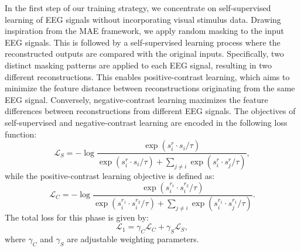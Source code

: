 \documentclass[conference]{IEEEtran}
\begin{document}
In the first step of our training strategy, we concentrate on self-supervised learning of EEG signals without incorporating visual stimulus data. Drawing inspiration from the MAE framework, we apply random masking to the input EEG signals. This is followed by a self-supervised learning process where the reconstructed outputs are compared with the original inputs. Specifically, two distinct masking patterns are applied to each EEG signal, resulting in two different reconstructions. This enables positive-contrast learning, which aims to minimize the feature distance between reconstructions originating from the same EEG signal. Conversely, negative-contrast learning maximizes the feature differences between reconstructions from different EEG signals. The objectives of self-supervised and negative-contrast learning are encoded in the following loss function: 
\vspace{-4pt} 
\begin{equation}
    \mathcal{L}_S=-\log \frac{\exp \left(s_i^{r}\cdot s_i /\tau \right)}{\exp \left(s_i^{r}\cdot s_i /\tau \right)+\sum_{j\neq i}\exp \left(s_i^{r}\cdot s_j^{r} /\tau \right)},
\end{equation}
while the positive-contrast learning objective is defined as:
\begin{equation}
    \mathcal{L}_C=-\log \frac{\exp \left(s_i^{r_1}\cdot s_i^{r_2} /\tau \right)}{\exp \left(s_i^{r_1}\cdot s_i^{r_2} /\tau \right)+\sum_{j\neq i}\exp \left(s_i^{r_1}\cdot s_j^{r_1} /\tau \right)}.
\end{equation} 
The total loss for this phase is given by:  
\begin{equation}\label{equ_rcrs}
    \mathcal{L}_1=\gamma_C \mathcal{L}_C+\gamma_S \mathcal{L}_S,
\end{equation}
where $\gamma_C$ and $\gamma_S$ are adjustable weighting parameters.
\end{document}

